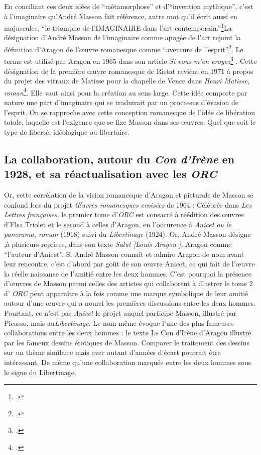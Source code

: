 En conciliant ces deux idées de \enquote{métamorphose} et d’\enquote{invention mythique}, c’est à l’imaginaire qu’André Masson fait référence, autre mot qu’il écrit aussi en majuscules, \enquote{le triomphe de l’IMAGINAIRE dans l’art contemporain.}\footcite[p19]{rebelle}La désignation d’André Masson de l’imaginaire comme apogée de l’art rejoint la définition d’Aragon de l’\oe{}uvre romanesque comme \enquote{aventure de l’esprit}\footcite{sivous}. Le terme est utilisé par Aragon en 1965 dans son article \emph{Si vous m'en croyez}\footcite[p1]{sivous} . Cette désignation de la première \oe{}uvre romanesque de Ristat revient en 1971 à propos du projet des vitraux de Matisse pour la chapelle de Vence dans \emph{Henri Matisse, roman}\footcite[p643]{aragonmatisse}. Elle vaut ainsi pour la création au sens large. Cette idée comporte par nature une part d’imaginaire qui se traduirait par un processus d’évasion de l’esprit. On se rapproche avec cette conception romanesque de l’idée de libération totale, laquelle est l’exigence que se fixe Masson dans ses \oe{}uvres. Quel que soit le type de liberté, idéologique ou libertaire. 

\subsection{La collaboration, autour du \emph{Con d'Irène} en 1928, et sa réactualisation avec les \emph{ORC}}

Or, cette corrélation de la vision romanesque d’Aragon et picturale de Masson se confond lors du projet \emph{\OE{}uvres romanesques croisées} de 1964 : Célébrés dans \emph{Les Lettres françaises}, le premier tome d’\emph{ORC} est consacré à réédition des \oe{}uvres d’Elsa Triolet et le second à celles d’Aragon, en l’occurence à \emph{Anicet ou le panorama, roman} (1918)  suivi du  \emph{Libertinage }(1924). Or, André Masson désigne ,à plusieurs reprises, dans son texte \emph{Salut [Louis Aragon ]}, Aragon comme \enquote{l’auteur d’Anicet}. Si André Masson connaît et admire Aragon de nom avant leur rencontre, c’est d’abord par goût de son \oe{}uvre Anicet, ce qui fait de l’\oe{}uvre la réelle naissance de l’amitié entre les deux hommes. C’est pourquoi la présence d’\oe{}uvres de Masson parmi celles des artistes qui collaborent à illustrer le tome 2 d’ \emph{ORC} peut apparaître à la fois comme une marque symbolique de leur amitié autour d’une \oe{}uvre qui a nourri les premières discussions entre les deux hommes. Pourtant, ce n’est pas \emph{Anicet} le projet auquel participe Masson, illustré par Picasso, mais au\emph{Libertinage}. Le nom même évoque l’une des plus fameuses collaborations entre les deux hommes : le texte Le Con d’Irène d’Aragon illustré par les fameux dessins érotiques de Masson. Comparer le traitement des dessins sur un thème similaire mais avec autant d’années d’écart pourrait être intéressant. De même qu’une collaboration marquée entre les deux hommes sous le signe du Libertinage. 

